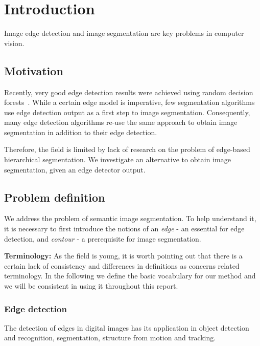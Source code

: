 \chapter{Introduction}
Image edge detection and image segmentation are key problems in computer vision.

\label{Chapter1}
\section{Motivation}
Recently, very good edge detection results were achieved using random decision forests~\cite{DollarICCV13edges}. While a certain edge model is %
imperative, few segmentation algorithms use edge detection output as a first step to image segmentation. Consequently, many edge detection algorithms re-use the same approach to obtain image segmentation in addition %
to their edge detection.

Therefore, the field is limited by lack of research on the problem of edge-based hierarchical segmentation. We investigate an alternative %
to obtain image segmentation, given an edge detector output.

\section{Problem definition}
We address the problem of semantic image segmentation. To help understand it, it is necessary to first introduce the notions of an {\it edge} - an essential for edge detection, and {\it contour} - a prerequisite for image segmentation.

\textbf{Terminology:} As the field is young, it is worth pointing out that there is a certain lack of consistency and differences in definitions as concerns related terminology. In the following we define the basic vocabulary for our method and we will be consistent in using it throughout this report.

\subsection{Edge detection}
The detection of edges in digital images has its application in %
object detection and recognition, segmentation, structure from motion and tracking.

